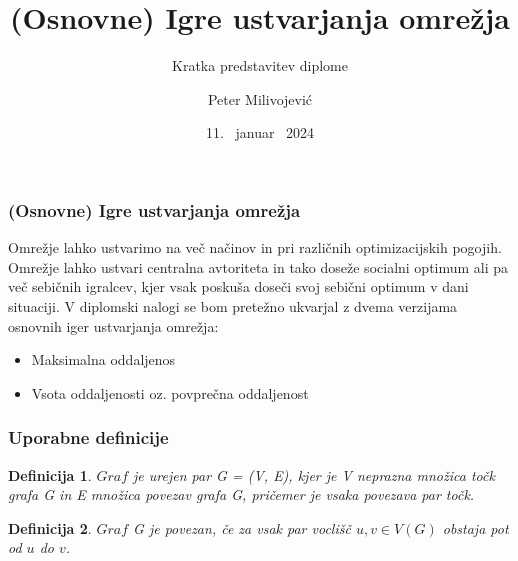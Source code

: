 \documentclass[12pt, hyperref={unicode}]{beamer}
\title{(Osnovne) Igre ustvarjanja omrežja}
\subtitle{Kratka predstavitev diplome}
\author{Peter Milivojević}
\institute[FMF]{Fakulteta za matematiko in fiziko}
\date{11. \ januar \ 2024}
\newtheorem{definicija}{Definicija}
\begin{document}
\begin{frame}
    \titlepage
\end{frame}


\begin{frame}
   
  \frametitle{(Osnovne) Igre ustvarjanja omrežja}
  Omrežje lahko ustvarimo na več načinov in pri različnih optimizacijskih pogojih.
  Omrežje lahko ustvari centralna avtoriteta in tako doseže socialni optimum ali pa
  več sebičnih igralcev, kjer vsak poskuša doseči svoj sebični optimum v dani situaciji.
  V diplomski nalogi se bom pretežno ukvarjal z dvema verzijama osnovnih iger ustvarjanja omrežja:
  \vspace{1mm}
  \begin{itemize}
    \item Maksimalna oddaljenos
    \item Vsota oddaljenosti oz. povprečna oddaljenost
  \end{itemize}

\end{frame}

\begin{frame}
   
    \frametitle{Uporabne definicije}
    \begin{definicija}
    $Graf$ je urejen par G = (V, E), kjer je V neprazna množica točk grafa G in E množica povezav grafa G, pričemer je vsaka povezava par točk.
    \end{definicija}

    \begin{definicija}
    $Graf$ G je povezan, če za vsak par voclišč $u, v \in V(G)$ obstaja pot od $u$ do $v$.
    \end{definicija}

\end{frame}
\end{document}

